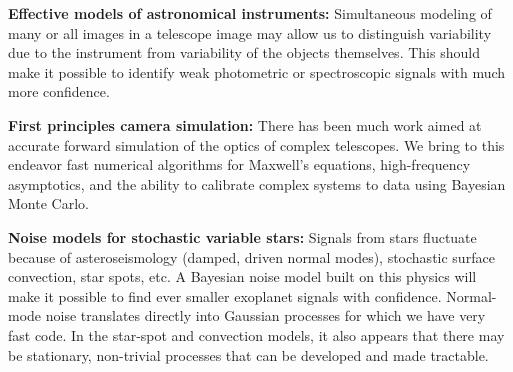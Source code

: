 \documentclass[12pt]{article}
\begin{document}
\textbf{Effective models of astronomical instruments:}
Simultaneous modeling of many or all images in a telescope image 
may allow us to distinguish variability due to the instrument from
variability of the objects themselves.  
This should make it possible to identify weak photometric or spectroscopic
signals with much more confidence.

\textbf{First principles camera simulation:} 
There has been much work aimed at accurate forward simulation of the optics 
of complex telescopes.
We bring to this endeavor fast numerical algorithms for Maxwell's equations,
high-frequency asymptotics, and the ability to calibrate complex systems 
to data using Bayesian Monte Carlo.



\textbf{Noise models for stochastic variable stars:}
Signals from stars fluctuate because of asteroseismology 
(damped, driven normal modes), stochastic surface convection, star
spots, etc.
A Bayesian noise model built on this physics will make it possible to 
find ever smaller exoplanet signals with confidence.
Normal-mode noise translates directly into Gaussian processes 
for which we have very fast code.
In the star-spot and convection models, it also appears that there may
be stationary, non-trivial processes that can be developed and made
tractable.

\end{document}
